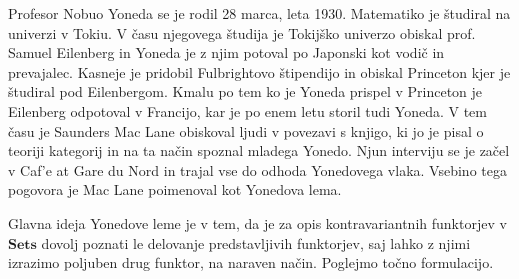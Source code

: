 \documentclass[12pt,a4paper]{book}
\theoremstyle{definition}
\theoremstyle{plain}
\theoremstyle{definition}
\theoremstyle{remark}
\newcommand{\cat}[1]{\textbf{#1}}
\begin{document}
Profesor Nobuo Yoneda se je rodil 28 marca, leta 1930. Matematiko je študiral na univerzi v Tokiu. V času njegovega študija je Tokijško univerzo obiskal prof. Samuel Eilenberg in Yoneda je z njim potoval po Japonski kot vodič in prevajalec. Kasneje je pridobil Fulbrightovo štipendijo in obiskal Princeton kjer je študiral pod Eilenbergom. Kmalu po tem ko je Yoneda prispel v Princeton je Eilenberg odpotoval v Francijo, kar je po enem letu storil tudi Yoneda. V tem času je Saunders Mac Lane obiskoval ljudi v povezavi s knjigo, ki jo je pisal o teoriji kategorij in na ta način spoznal mladega Yonedo. Njun interviju se je začel v Caf'e at Gare du Nord in trajal vse do odhoda Yonedovega vlaka. Vsebino tega pogovora je Mac Lane poimenoval kot Yonedova lema.


Glavna ideja Yonedove leme je v tem, da je za opis kontravariantnih funktorjev v $\cat{Sets}$ dovolj poznati le delovanje predstavljivih funktorjev, saj lahko z njimi izrazimo poljuben drug funktor, na naraven način. Poglejmo točno formulacijo.
\end{document}
